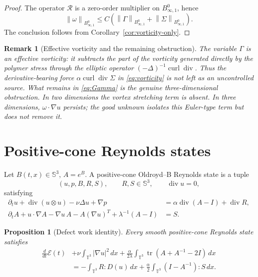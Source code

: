 \documentclass[10pt,a4paper]{amsart}
\numberwithin{equation}{section}
\newtheorem{proposition}[theorem]{Proposition}
\newtheorem{remark}[theorem]{Remark}
\newcommand{\T}{\mathbb T}
\newcommand{\Id}{I}
\newcommand{\Sym}{\mathbb S}
\newcommand{\tr}{\operatorname{tr}}
\newcommand{\divv}{\operatorname{div}}
\newcommand{\curl}{\operatorname{curl}}
\newcommand{\Besov}{B^0_{\infty,1}}
\newcommand{\calE}{\mathcal E}
\newcommand{\calR}{\mathcal R}
\newcommand{\norm}[1]{\left\lVert #1\right\rVert}
\begin{document}
\begin{proof}
The operator \(\calR\) is a zero-order multiplier on \(B^0_{\infty,1}\), hence
\[
  \norm{\omega}_{\Besov}
  \le C(\norm{\Gamma}_{\Besov}+\norm{\Sigma}_{\Besov}).
\]
The conclusion follows from Corollary~\ref{cor:vorticity-only}.
\end{proof}

\begin{remark}[Effective vorticity and the remaining obstruction]
The variable \(\Gamma\) is an effective vorticity: it subtracts the part of the
vorticity generated directly by the polymer stress through the elliptic
operator \((-\Delta)^{-1}\curl\divv\).  Thus the derivative-bearing force
\(\alpha\curl\divv\Sigma\) in \eqref{eq:vorticity} is not left as an
uncontrolled source.  What remains in \eqref{eq:Gamma} is the genuine
three-dimensional obstruction.  In two dimensions the vortex stretching term is
absent.  In three dimensions, \(\omega\cdot\nabla u\) persists; the good
unknown isolates this Euler-type term but does not remove it.
\end{remark}

\section{Positive-cone Reynolds states}

Let \(B(t,x)\in\Sym^3\), \(A=e^B\).  A positive-cone Oldroyd--B Reynolds state
is a tuple
\[
  (u,p,B,R,S),\qquad R,S\in\Sym^3,\qquad \divv u=0,
\]
satisfying
\begin{align}
  \partial_t u+\divv(u\otimes u)-\nu\Delta u+\nabla p
  &=
  \alpha\divv(A-\Id)+\divv R,
  \label{eq:reynolds-momentum}\\
  \partial_t A+u\cdot\nabla A-\nabla u\,A-A(\nabla u)^T+\lambda^{-1}(A-\Id)
  &=S .
  \label{eq:reynolds-conf}
\end{align}

\begin{proposition}[Defect work identity]
\label{prop:defect-work}
Every smooth positive-cone Reynolds state satisfies
\begin{equation}
\begin{aligned}
  \frac{d}{dt}\calE(t)
  &+\nu\int_{\T^3}|\nabla u|^2\,dx
  +\frac{\alpha}{2\lambda}
  \int_{\T^3}\tr(A+A^{-1}-2\Id)\,dx\\
  &=
  -\int_{\T^3}R:D(u)\,dx
  +\frac{\alpha}{2}\int_{\T^3}(\Id-A^{-1}):S\,dx .
\end{aligned}
  \label{eq:defect-work}
\end{equation}
\end{proposition}
\end{document}
